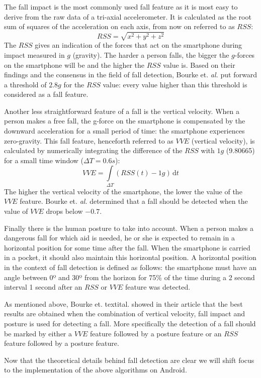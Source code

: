 The fall impact is the most commonly used fall feature as it is most easy to derive from the raw data of a tri-axial accelerometer. It is calculated as the root sum of squares of the acceleration on each axis, from now on referred to as $RSS$: \[RSS = \sqrt{x^2 + y^2 + z^2}\] The $RSS$ gives an indication of the forces that act on the smartphone during impact measured in $g$ (gravity). The harder a person falls, the bigger the $g$-forces on the smartphone will be and the higher the $RSS$ value is. Based on their findings and the consensus in the field of fall detection, Bourke et. \textit{al.} put forward a threshold of $2.8g$ for the $RSS$ value: every value higher than this threshold is considered as a fall feature.

Another less straightforward feature of a fall is the vertical velocity. When a person makes a free fall, the g-force on the smartphone is compensated by the downward acceleration for a small period of time: the smartphone experiences zero-gravity. This fall feature, henceforth referred to as $VVE$ (vertical velocity), is calculated by numerically integrating the difference of the $RSS$ with $1g$ (9.80665) for a small time window ($\Delta T = 0.6s$): \[VVE = \int\limits_{\Delta T} \! (RSS(t) - 1g) \, \mathrm{d}t\] The higher the vertical velocity of the smartphone, the lower the value of the $VVE$ feature. Bourke et. \textit{al.} determined that a fall should be detected when the value of $VVE$ drops below $-0.7$.

Finally there is the human posture to take into account. When a person makes a dangerous fall for which aid is needed, he or she is expected to remain in a horizontal position for some time after the fall. When the smartphone is carried in a pocket, it should also maintain this horizontal position. A horizontal position in the context of fall detection is defined as follows: the smartphone must have an angle between 0º and 30º from the horizon for 75\% of the time during a 2 second interval 1 second after an $RSS$ or $VVE$ feature was detected.

As mentioned above, Bourke et. textit{al.} showed in their article that the best results are obtained when the combination of vertical velocity, fall impact and posture is used for detecting a fall. More specifically the detection of a fall should be marked by either a $VVE$ feature followed by a posture feature or an $RSS$ feature followed by a posture feature.

Now that the theoretical details behind fall detection are clear we will shift focus to the implementation of the above algorithms on Android.

